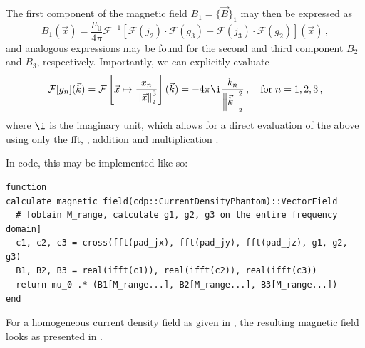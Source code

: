 \documentclass[10pt]{article}
\renewcommand{\norm}[1]{\left\lVert#1\right\rVert_{\scriptscriptstyle 2}}
\begin{document}
  The first component of the magnetic field $B_1 = \{\vec{B}\}_1$ may then be expressed as
  $$B_1(\vec{x}) = \frac{\mu_0}{4\pi}\mathcal{F}^{-1}\left[\mathcal{F}(j_2) \cdot \mathcal{F}(g_3) - \mathcal{F}(j_3) \cdot \mathcal{F}(g_2)\right](\vec{x})\,,$$
  and analogous expressions may be found for the second and third component $B_2$ and $B_3$, respectively.
  Importantly, we can explicitly evaluate
  $$\mathcal{F}[g_n](\vec{k}) = \mathcal{F}\left[\vec{x} \mapsto \frac{x_n}{\norm{\vec{x}}^3}\right](\vec{k}) = -4\pi\i \frac{k_n}{\norm{\vec{k}}^2}\,, \quad\text{for}\; n=1,2,3\,,$$
  where $\i$ is the imaginary unit,
  which allows for a direct evaluation of the above using only the \gls{fft}, , addition and multiplication \parencite{2020-biot-savart-evaluation-fft}.

  In code, this may be implemented like so:
  \begin{verbatim}
function calculate_magnetic_field(cdp::CurrentDensityPhantom)::VectorField
  # [obtain M_range, calculate g1, g2, g3 on the entire frequency domain]
  c1, c2, c3 = cross(fft(pad_jx), fft(pad_jy), fft(pad_jz), g1, g2, g3)
  B1, B2, B3 = real(ifft(c1)), real(ifft(c2)), real(ifft(c3))
  return mu_0 .* (B1[M_range...], B2[M_range...], B3[M_range...])
end
  \end{verbatim}

  For a homogeneous current density field as given in , the resulting magnetic field looks as presented in .
\end{document}

